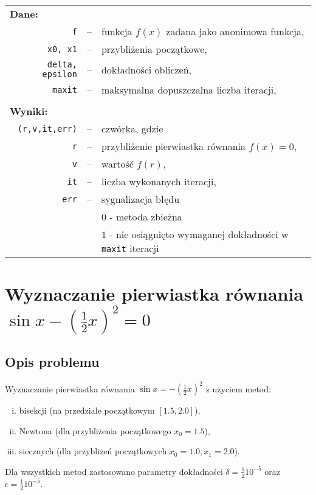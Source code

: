 \documentclass[11pt]{mk-polish-lab-report}
\begin{document}
\begin{longtable}[l]{r  c  l}
\multicolumn{1}{l}{\textbf{Dane:}}&& \\
\texttt{f}&--&funkcja $f(x)$ zadana jako anonimowa funkcja, \\
\texttt{x0, x1}&--&przybliżenia początkowe, \\
\texttt{delta, epsilon}&--&dokładności obliczeń, \\
\texttt{maxit}&--&maksymalna dopuszczalna liczba iteracji, \\
&& \\
\multicolumn{1}{l}{\textbf{Wyniki:}}&& \\
\texttt{(r,v,it,err)}&--&czwórka, gdzie \\
\texttt{r}&--&przybliżenie pierwiastka równania $f(x) = 0$, \\
\texttt{v}&--&wartość $f(r)$, \\
\texttt{it}&--&liczba wykonanych iteracji, \\
\texttt{err}&--&sygnalizacja błędu \\
&&$0$ - metoda zbieżna \\
&&$1$ - nie osiągnięto wymaganej dokładności w \texttt{maxit} iteracji \\
\end{longtable}


\section{Wyznaczanie pierwiastka równania $\sin{x}-(\frac{1}{2}x)^2 = 0$}

\subsection{Opis problemu}
Wyznaczanie pierwiastka równania $\sin{x} = -(\frac{1}{2}x)^2$ z użyciem metod:
\begin{enumerate}[(i)]
\item bisekcji (na przedziale początkowym $[1.5, 2.0]$),
\item Newtona (dla przybliżenia początkowego $x_0 = 1.5$),  
\item siecznych (dla przybliżeń początkowych $x_0 = 1.0, x_1 = 2.0$).
\end{enumerate}
Dla wszystkich metod zastosowano parametry dokładności $\delta = \frac{1}{2}10^{-5}$ oraz $\epsilon = \frac{1}{2}10^{-5}$.
\end{document}
